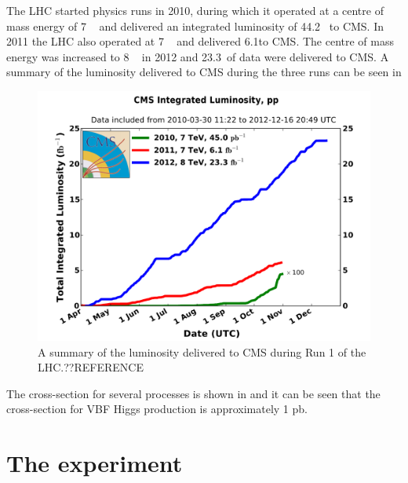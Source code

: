 The LHC started physics runs in 2010, during which it operated at a centre of mass energy of 7 \TeV~ and delivered an integrated luminosity of 44.2 \invpb ~to CMS. In 2011 the LHC also operated at 7 \TeV~ and delivered 6.1\invfb to CMS. The centre of mass energy was increased to 8 \TeV~ in 2012 and 23.3\invfb~of data were delivered to CMS. A summary of the luminosity delivered to CMS during the three runs can be seen in   %

\begin{figure}
  \includegraphics[width=1.2\largefigwidth]{plots/detector/int_lumi_cumulative_pp_2.pdf}
  \caption{A summary of the luminosity delivered to CMS during Run 1 of the LHC.??REFERENCE}
  \label{fig:lumisummary}
\end{figure}

The cross-section for several processes is shown in  and it can be seen that the cross-section for VBF Higgs production is approximately 1 pb. %


\section{The \CMS experiment}
\label{sec:CMSInDetail}

